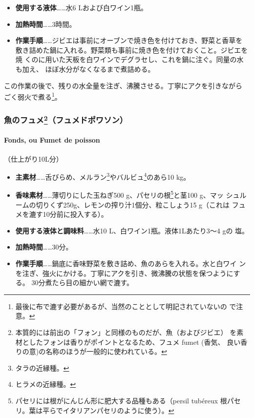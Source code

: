 \begin{recette}
\begin{itemize}
\item
  \textbf{使用する液体}\ldots{}\ldots{}水6 Lおよび白ワイン1瓶。
\item
  \textbf{加熱時間}\ldots{}\ldots{}3時間。
\item
  \textbf{作業手順}\ldots{}\ldots{}ジビエは事前にオーブンで焼き色を付けておき、野菜と香草を
  敷き詰めた鍋に入れる。野菜類も事前に焼き色を付けておくこと。ジビエを焼
  くのに用いた天板を白ワインでデグラセし、これを鍋に注ぐ。同量の水も加え、
  ほぼ水分がなくなるまで煮詰める。
\end{itemize}

この作業の後で、残りの水全量を注ぎ、沸騰させる。丁寧にアクを引きながら
ごく弱火で煮る\footnote{最後に布で漉す必要があるが、当然のこととして明記されていないの
  で注意。}。

\maeaki

\hypertarget{fumetdepoisson}{%
\subsubsection[魚のフュメ（フュメドポワソン）]{\texorpdfstring{魚のフュメ\footnote{本質的には前出の「フォン」と同様のものだが、魚（およびジビエ）
  を素材としたフォンは香りがポイントとなるため、フュメ fumet (香気、
  良い香りの意)の名称のほうが一般的に使われている。}（フュメドポワソン）}{魚のフュメ（フュメドポワソン）}}\label{fumetdepoisson}}

\hypertarget{fumet-de-poisson}{%
\paragraph{Fonds, ou Fumet de poisson}\label{fumet-de-poisson}}


（仕上がり10L分）

\begin{itemize}
\item
  \textbf{主素材}\ldots{}\ldots{}舌びらめ、メルラン\footnote{タラの近縁種。}やバルビュ\footnote{ヒラメの近縁種。}のあら10
  kg。
\item
  \textbf{香味素材}\ldots{}\ldots{}薄切りにした玉ねぎ500
  g、パセリの根\footnote{パセリには根がにんじん形に肥大する品種もある（persil
    tubéreux 根パセリ。葉は平らでイタリアンパセリのように使う）。}と茎100
  g、マッ シュルームの切りくず250g、レモンの搾り汁1個分、粒こしょう15
  g（これは フュメを漉す10分前に投入する）。
\item
  \textbf{使用する液体と調味料}\ldots{}\ldots{}水10
  L、白ワイン1瓶。液体1Lあたり3〜4 gの 塩。
\item
  \textbf{加熱時間}\ldots{}\ldots{}30分。
\item
  \textbf{作業手順}\ldots{}\ldots{}鍋底に香味野菜を敷き詰め、魚のあらを入れる。水と白ワイ
  ンを注ぎ、強火にかける。丁寧にアクを引き、微沸騰の状態を保つようにする。
  30分煮たら目の細かい網で漉す。
\end{itemize}


\end{recette}
